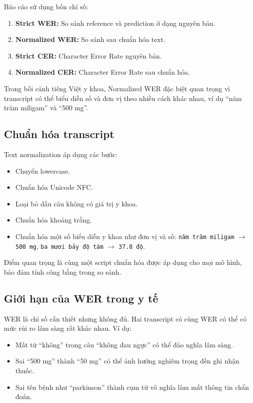 \documentclass[12pt,a4paper]{article}
\begin{document}
Báo cáo sử dụng bốn chỉ số:
\begin{enumerate}[leftmargin=1.2cm]
    \item \textbf{Strict WER:} So sánh reference và prediction ở dạng nguyên bản.
    \item \textbf{Normalized WER:} So sánh sau chuẩn hóa text.
    \item \textbf{Strict CER:} Character Error Rate nguyên bản.
    \item \textbf{Normalized CER:} Character Error Rate sau chuẩn hóa.
\end{enumerate}

Trong bối cảnh tiếng Việt y khoa, Normalized WER đặc biệt quan trọng vì transcript có thể biểu diễn số và đơn vị theo nhiều cách khác nhau, ví dụ ``năm trăm miligam'' và ``500 mg''.

\subsection{Chuẩn hóa transcript}

Text normalization áp dụng các bước:
\begin{itemize}[leftmargin=1.2cm]
    \item Chuyển lowercase.
    \item Chuẩn hóa Unicode NFC.
    \item Loại bỏ dấu câu không có giá trị y khoa.
    \item Chuẩn hóa khoảng trắng.
    \item Chuẩn hóa một số biểu diễn y khoa như đơn vị và số: \texttt{năm trăm miligam} $\rightarrow$ \texttt{500 mg}, \texttt{ba mươi bảy độ tám} $\rightarrow$ \texttt{37.8 độ}.
\end{itemize}

Điểm quan trọng là cùng một script chuẩn hóa được áp dụng cho mọi mô hình, bảo đảm tính công bằng trong so sánh.

\subsection{Giới hạn của WER trong y tế}

WER là chỉ số cần thiết nhưng không đủ. Hai transcript có cùng WER có thể có mức rủi ro lâm sàng rất khác nhau. Ví dụ:
\begin{itemize}[leftmargin=1.2cm]
    \item Mất từ ``không'' trong câu ``không đau ngực'' có thể đảo nghĩa lâm sàng.
    \item Sai ``500 mg'' thành ``50 mg'' có thể ảnh hưởng nghiêm trọng đến ghi nhận thuốc.
    \item Sai tên bệnh như ``parkinson'' thành cụm từ vô nghĩa làm mất thông tin chẩn đoán.
\end{itemize}
\end{document}
